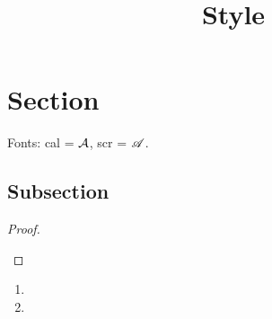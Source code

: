 \documentclass{article}
\title{Style}
\begin{document}
\maketitle
\section{Section}
Fonts: cal = $\cal A$, scr = $\scr A$.
\subsection{Subsection}
\lipsum[1] 
\begin{theorem}
\lipsum[66]
\begin{indeg}
\lipsum[75]
\end{indeg}
\begin{indproof}
\lipsum[2]
\end{indproof}
\end{theorem}
\begin{proof}
\lipsum[3]
\begin{indlem}
\lipsum[66]
\end{indlem}
\begin{indproof}
\lipsum[4]
\end{indproof}
\lipsum[5]
\end{proof}
\lipsum[23]
\begin{example} \lipsum[75]
\begin{enumerate}
    \item \lipsum[2]
    \item \lipsum[3]
    \begin{enmlem}
    \lipsum[66] 
    \end{enmlem}
    \begin{enmproof}
    \lipsum[24]
    \end{enmproof}
\end{enumerate}
\end{example}
\end{document}
